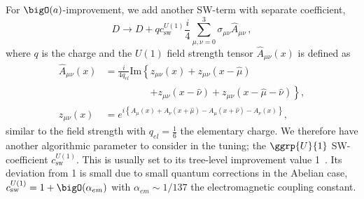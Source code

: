 For $\bigO(a)$-improvement, we add another SW-term with separate coefficient,
\begin{equation} \label{eq:Dw2}
D \rightarrow D + q c_\mathrm{sw}^{U(1)} \frac{i}{4} \sum_{\mu,\nu=0}^3 \sigma_{\mu \nu} \hat{A}_{\mu \nu}\,,
\end{equation}
where $q$ is the charge and the $U(1)$ field strength tensor $\hat{A}_{\mu \nu}(x)$ is defined as
\begin{equation}
\begin{aligned}
\hat{A}_{\mu \nu}(x) &= \frac{i}{4 q_{el}} \text{Im} \left\{
      z_{\mu \nu}(x)
    + z_{\mu \nu}(x-\hat{\mu})
    \right. \\
    &\phantom{=\frac{i}{4 q_{\text{el}}} \text{Im} \left\{ \right.} \left. 
    + z_{\mu \nu}(x-\hat{\nu})
    + z_{\mu \nu}(x-\hat{\mu}-\hat{\nu})
\right\}, \\
z_{\mu \nu}(x) &= e^{i\left\{
      A_{\mu}(x)
    + A_{\nu}(x+\hat{\mu})
    - A_{\mu}(x+\hat{\nu})
    - A_{\nu}(x)
\right\}},
\end{aligned}
\end{equation}
similar to the  field strength with $q_{el} = \frac{1}{6}$ the elementary charge.
We therefore have another algorithmic parameter to consider in the tuning; the $\ggrp{U}{1}$ SW-coefficient $c_\mathrm{sw}^{U(1)}$.
This is usually set to its tree-level improvement value \num{1}~\cite{RCstar22}.
Its deviation from \num{1} is small due to small quantum corrections in the Abelian case, $c_\mathrm{sw}^{U(1)} = 1 + \bigO(\alpha_{em})$ with $\alpha_{em} \sim 1/137$ the electromagnetic coupling constant.

